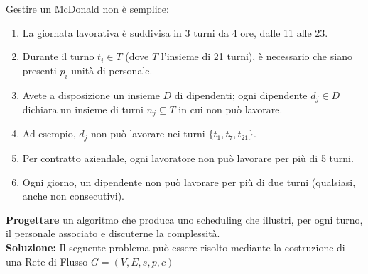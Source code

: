 \documentclass[../cheatSheetAlgoritmi.tex]{subfiles}
\begin{document}
Gestire un McDonald non è semplice:
\begin{enumerate}
	\item La giornata lavorativa è suddivisa in 3 turni da 4 ore, dalle 11 alle 23.
	\item Durante il turno $t_{i} \in T$ (dove $T$ l'insieme di 21 turni), è necessario che siano presenti $p_{i}$ unità di personale. 
	\item Avete a disposizione un insieme $D$ di dipendenti; ogni dipendente $d_{j} \in D$ dichiara un insieme di turni $n_{j} \subseteq T$ in cui non può lavorare.
	\item Ad esempio, $d_{j}$ non può lavorare nei turni $\{t_{1}, t_{7}, t_{21}\}$.
	\item Per contratto aziendale, ogni lavoratore non può lavorare per più di 5 turni.
	\item Ogni giorno, un dipendente non può lavorare per più di due turni (qualsiasi, anche non consecutivi).
\end{enumerate}
\textbf{Progettare} un algoritmo che produca uno scheduling che illustri, per ogni turno, il personale associato e discuterne la complessità.\\
\textbf{Soluzione:} Il seguente problema può essere risolto mediante la costruzione di una Rete di Flusso $G = (V, E, s, p, c)$
\end{document}
